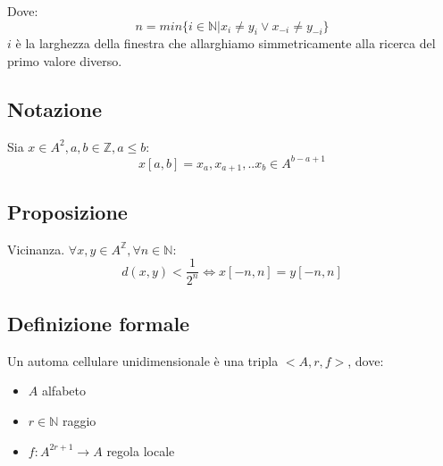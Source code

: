 Dove:
$$n = min\{ i \in \mathds{N} | x_i \neq y_i \vee x_{-i} \neq y_{-i} \} $$ $i$ 
è la larghezza della finestra che allarghiamo simmetricamente alla ricerca del primo valore diverso.
	
\subsection{Notazione} 
Sia $x \in A^2, a,b \in \mathds{Z}, a \leq b$:
$$x[a,b] = x_a, x_{a+1}, .. x_{b} \in A^{b-a+1}$$
	
	
\subsection{Proposizione} Vicinanza. $\forall x,y \in A^\mathds{Z}, \forall n \in \mathds{N}:$
\begin{equation}   d(x,y) < \frac{1}{2^n} \iff x[-n,n] = y[-n,n]
\end{equation}
	
\subsection{Definizione formale}
	
Un automa cellulare unidimensionale è una tripla $<A, r, f>$, dove:
	
\begin{itemize}
	\item $A$ alfabeto
	\item $r \in \mathds{N}$ raggio
	\item $f: A^{2r+1} \rightarrow A$ regola locale
\end{itemize}
	



